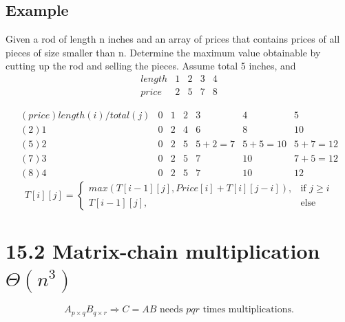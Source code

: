\documentclass[a4paper]{article}
\begin{document}
\subsection*{Example}
Given a rod of length n inches and an array of prices that contains prices of all pieces of size smaller than n. Determine the maximum value obtainable by cutting up the rod and selling the pieces. Assume total 5 inches, and
    $$
    \begin{array}{c|cccc}
    length & 1 & 2 & 3 & 4\\
    \hline
    price & 2 & 5 & 7 & 8
    \end{array}
    $$
    
    $$
    \begin{array}{c|cccccc}
    (price)length(i)/total(j)& 0 & 1 & 2 & 3 & 4 & 5\\
    \hline
    (2)1 & 0 & 2 & 4 & 6 & 8 & 10 \\
    (5)2 & 0 & 2 & 5 & 5+2=7 & 5+5=10 & 5+7=12 \\
    (7)3 & 0 & 2 & 5 & 7 & 10 & 7+5=12 \\
    (8)4 & 0 & 2 & 5 & 7 & 10 & 12
    \end{array}
    $$
    $$
    T[i][j]=
        \begin{cases}
        max(T[i-1][j], Price[i]+ T[i][j-i]),  & \text{if $j \geq i$} \\
        T[i-1][j], & \text{else}
        \end{cases}
    $$
    
\section*{15.2 Matrix-chain multiplication $\Theta(n^3)$}
$$A_{p\times q} B_{q\times r}\Rightarrow C=AB \text{ needs } pqr \text{ times multiplications.}$$
\end{document}
